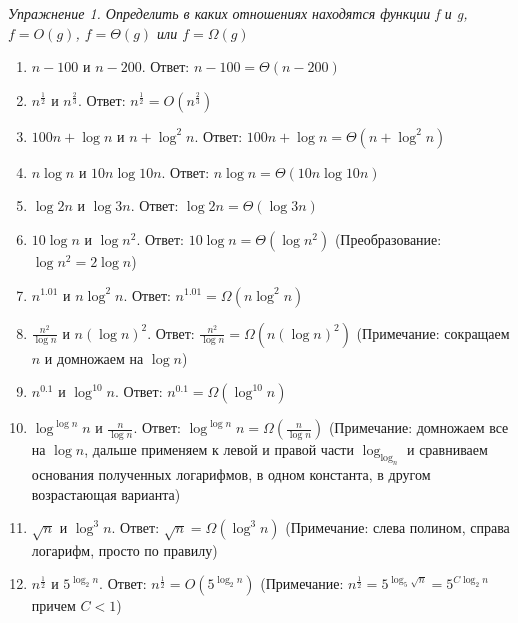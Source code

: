 \textit{Упражнение 1. Определить в каких отношениях находятся функции f и g, $ f = O ( g ) $, $ f = \Theta ( g ) $ или $ f = \Omega ( g ) $}
\begin{enumerate}
\item $ n-100 $ и $ n - 200 $. Ответ: $ n-100 = \Theta ( n-200 ) $

\item $ n^{\frac{1}{2}} $ и $ n^{\frac{2}{3}} $. Ответ: $ n^{\frac{1}{2}} = O ( n^{\frac{2}{3}} ) $

\item $ 100n + \log n $ и $ n + \log ^2 n $. Ответ: $ 100n + \log n = \Theta ( n + \log ^2 n ) $

\item $ n \log n $ и $ 10n \log 10n $. Ответ: $ n \log n = \Theta ( 10n \log 10n ) $ 

\item $ \log 2n $ и $ \log 3n $. Ответ: $ \log 2n = \Theta ( \log 3n ) $

\item $ 10 \log n $ и $ \log n^2 $. Ответ: $ 10 \log n = \Theta ( \log n^2 ) $ (Преобразование: $ \log n^2 = 2 \log n $)

\item $ n^{1.01} $ и $ n \log ^2 n $. Ответ: $ n^{1.01} = \Omega ( n \log ^2 n ) $

\item $ \frac{n^2}{\log n} $ и $ n (\log n)^2 $. Ответ: $ \frac{n^2}{\log n} = \Omega ( n (\log n)^2 ) $ (Примечание: сокращаем $ n $ и домножаем на $ \log n $)

\item $ n^{0.1} $ и $ \log ^{10} n $. Ответ: $ n^{0.1} = \Omega ( \log ^{10} n ) $

\item $ \log ^{\log n} n $ и $ \frac{n}{\log n} $. Ответ: $ \log ^{\log n} n = \Omega ( \frac{n}{\log n} ) $ (Примечание: домножаем все на $ \log n $, дальше применяем к левой и правой части $ \log _{\log _n} $ и сравниваем основания полученных логарифмов, в одном константа, в другом возрастающая варианта)

\item $ \sqrt{n} $ и $ \log ^3 n $. Ответ: $ \sqrt{n} = \Omega ( \log ^3 n ) $ (Примечание: слева полином, справа логарифм, просто по правилу)

\item $ n^{\frac{1}{2}} $ и $ 5^{\log _2 n} $. Ответ: $ n^{\frac{1}{2}} = O ( 5^{\log _2 n} ) $ (Примечание: $ n^{\frac{1}{2}} = 5^{\log _5 \sqrt{n}} = 5^{C \log _2 n} $ причем $ C < 1 $)


\end{enumerate}
